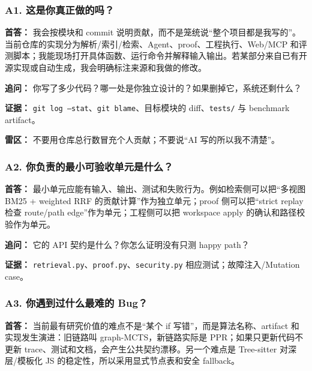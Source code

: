 \documentclass[UTF8,12pt,openany]{ctexbook}
\begin{document}
\subsubsection{A1. 这是你真正做的吗？}

\textbf{首答：} 我会按模块和 commit 说明贡献，而不是笼统说“整个项目都是我写的”。当前仓库的实现分为解析/索引/检索、Agent、proof、工程执行、Web/MCP 和评测脚本；我能现场打开具体函数、运行命令并解释输入输出。若某部分来自已有开源实现或自动生成，我会明确标注来源和我做的修改。\par

\textbf{追问：} 你写了多少代码？哪一处是你独立设计的？如果删掉它，系统还剩什么？\par

\textbf{证据：} \texttt{git log --stat}、\texttt{git blame}、目标模块的 diff、\texttt{tests/} 与 benchmark artifact。\par

\textbf{雷区：} 不要用仓库总行数冒充个人贡献；不要说“AI 写的所以我不清楚”。\par

\subsubsection{A2. 你负责的最小可验收单元是什么？}

\textbf{首答：} 最小单元应能有输入、输出、测试和失败行为。例如检索侧可以把“多视图 BM25 + weighted RRF 的贡献计算”作为独立单元；proof 侧可以把“strict replay 检查 route/path edge”作为单元；工程侧可以把 workspace apply 的确认和路径校验作为单元。\par

\textbf{追问：} 它的 API 契约是什么？你怎么证明没有只测 happy path？\par

\textbf{证据：} \texttt{retrieval.py}、\texttt{proof.py}、\texttt{security.py} 相应测试；故障注入/Mutation case。\par

\subsubsection{A3. 你遇到过什么最难的 Bug？}

\textbf{首答：} 当前最有研究价值的难点不是“某个 if 写错”，而是算法名称、artifact 和实现发生演进：旧链路叫 graph-MCTS，新链路实际是 PPR；如果只更新代码不更新 trace、测试和文档，会产生公共契约漂移。另一个难点是 Tree-sitter 对深层/模板化 JS 的稳定性，所以采用显式节点表和安全 fallback。\par
\end{document}
